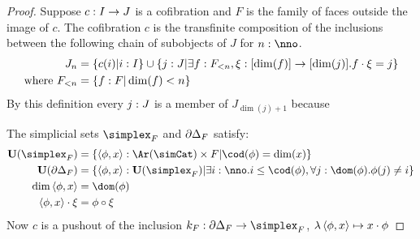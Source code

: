 \documentclass[csh.tex]{subfiles}
\begin{document}
\begin{proof}
Suppose $c: I\to J$ is a cofibration and $F$ is the family of faces outside the image of $c$.
The cofibration $c$ is the transfinite composition of the inclusions between the following chain of subobjects of $J$ for $n\of\nno$.
\begin{align*} 
J_n &= \left\{c(i)|i: I\right\}\cup\left\{ j: J \middle| \exists f: F_{<n}, \xi:[\dim(f)]\to [\dim(j)].f\cdot \xi = j \right\}\\
\textrm{where } F_{<n} &= \left\{f: F|\dim(f)<n\right\}
\end{align*}
By this definition every $j: J$ is a member of $J_{\dim(j)+1}$ because %

The simplicial sets $\simplex_F$ and $\partial\Delta_F$ satisfy:
\begin{align*}
\base(\simplex_F) &= \set{ \tuplet{\phi,x}\of\Ar(\simCat)\times F | \cod(\phi) = \dim(x) } \\
\base(\cycle_F) &= \set{\tuplet{\phi,x}\of\base(\simplex_F)\middle|\exists i\of\nno.i\leq \cod(\phi),\forall j\of \dom(\phi).\phi(j)\neq i} \\
\dim\tuplet{\phi,x} &= \dom(\phi) \\
\tuplet{\phi,x}\cdot \xi &=\phi\circ\xi
\end{align*}
Now $c$ is a pushout of the inclusion $k_F\of\cycle_F\to\simplex_F$, $\lambda \left\langle \phi,x \right\rangle \mapsto x\cdot \phi$ 



\end{proof}
\end{document}
